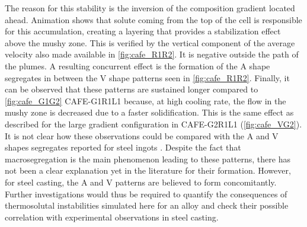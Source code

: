 %
The reason for this stability is the inversion of 
the composition gradient located ahead. Animation shows that solute coming from the top of the cell is responsible for this 
accumulation, creating a layering that provides a stabilization effect above the mushy zone. This is verified by the vertical 
component of the average velocity also made available in \cref{fig:cafe_R1R2}. It is negative outside the path of the plumes. A resulting 
concurrent effect is the formation of the A shape segregates in between the V shape patterns seen in \cref{fig:cafe_R1R2}. Finally, it can 
be observed that these patterns are sustained longer compared to \cref{fig:cafe_G1G2} CAFE-G1R1L1 because, at high cooling rate, 
the flow in the mushy zone is decreased due to a faster solidification. This is the same effect as described for the large gradient 
configuration in CAFE-G2R1L1 (\cref{fig:cafe_VG2}).
It is not clear how these observations could be compared with the A  and V  shapes segregates reported for steel ingots 
\citep{pickering_macrosegregation_2013}. Despite the fact that macrosegregation is the main phenomenon leading to these 
patterns, there has not been a clear explanation yet in the literature for their formation. However, for steel casting, 
the A and V patterns are believed to form concomitantly. Further investigations would thus be required to quantify the 
consequences of thermosolutal instabilities simulated here for an  alloy and check their possible correlation 
with experimental observations in steel casting.
%
